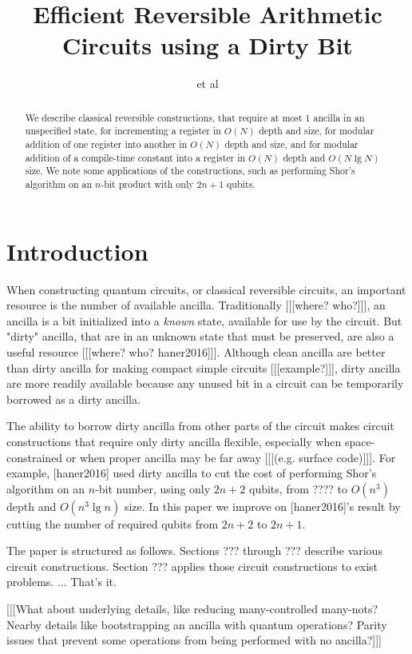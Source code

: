 \documentclass[twocolumn]{article}
\title{Efficient Reversible Arithmetic Circuits using a Dirty Bit}
\author{et al}
\begin{document}
\maketitle

\begin{abstract}
We describe classical reversible constructions, that require at most 1 ancilla in an unspecified state, for incrementing a register in $O(N)$ depth and size, for modular addition of one register into another in $O(N)$ depth and size, and for modular addition of a compile-time constant into a register in $O(N)$ depth and $O(N \lg N)$ size.
We note some applications of the constructions, such as performing Shor's algorithm on an $n$-bit product with only $2n+1$ qubits.
\end{abstract}

\section{Introduction}

When constructing quantum circuits, or classical reversible circuits, an important resource is the number of available ancilla.
Traditionally [[[where? who?]]], an ancilla is a bit initialized into a {\em known} state, available for use by the circuit.
But "dirty" ancilla, that are in an unknown state that must be preserved, are also a useful resource [[[where? who? haner2016]]].
Although clean ancilla are better than dirty ancilla for making compact simple circuits [[[example?]]], dirty ancilla are more readily available  because any unused bit in a circuit can be temporarily borrowed as a dirty ancilla.

The ability to borrow dirty ancilla from other parts of the circuit makes circuit constructions that require only dirty ancilla flexible, especially when space-constrained or when proper ancilla may be far away [[[(e.g. surface code)]]].
For example, [haner2016] used dirty ancilla to cut the cost of performing Shor's algorithm on an $n$-bit number, using only $2n+2$ qubits, from ???? to $O(n^3)$ depth and $O(n^3 \lg n)$ size.
In this paper we improve on [haner2016]'s result by cutting the number of required qubits from $2n+2$ to $2n+1$.

The paper is structured as follows.
Sections ??? through ??? describe various circuit constructions.
Section ??? applies those circuit constructions to exist problems.
... That's it.

[[[What about underlying details, like reducing many-controlled many-nots? Nearby details like bootstrapping an ancilla with quantum operations? Parity issues that prevent some operations from being performed with no ancilla?]]]
\end{document}
